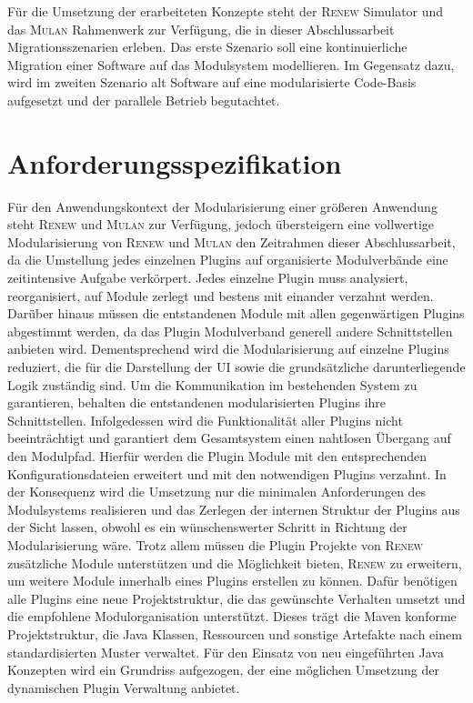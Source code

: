 	Für die Umsetzung der erarbeiteten Konzepte steht der \textsc{Renew} Simulator und das \textsc{Mulan} Rahmenwerk zur Verfügung, die in dieser Abschlussarbeit Migrationsszenarien erleben.\newline 
	Das erste Szenario soll eine kontinuierliche Migration einer Software auf das Modulsystem modellieren. Im Gegensatz dazu, wird im zweiten Szenario alt Software auf eine modularisierte Code-Basis aufgesetzt und der parallele Betrieb begutachtet. 

\section{Anforderungsspezifikation} 
	Für den Anwendungskontext der Modularisierung einer größeren Anwendung steht \textsc{Renew} und \textsc{Mulan} zur Verfügung, jedoch übersteigern eine vollwertige Modularisierung von \textsc{Renew} und \textsc{Mulan} den Zeitrahmen dieser Abschlussarbeit, da die Umstellung jedes einzelnen Plugins auf organisierte Modulverbände eine zeitintensive Aufgabe verkörpert. Jedes einzelne Plugin muss analysiert, reorganisiert, auf Module zerlegt und bestens mit einander verzahnt werden. Darüber hinaus müssen die entstandenen Module mit allen gegenwärtigen Plugins abgestimmt werden, da das Plugin Modulverband generell andere Schnittstellen anbieten wird. \bigbreak
	Dementsprechend wird die Modularisierung auf einzelne Plugins reduziert, die für die Darstellung der UI sowie die grundsätzliche darunterliegende Logik zuständig sind. Um die Kommunikation im bestehenden System zu garantieren, behalten die entstandenen modularisierten Plugins ihre Schnittstellen. Infolgedessen wird die Funktionalität aller Plugins nicht beeinträchtigt und garantiert dem Gesamtsystem einen nahtlosen Übergang auf den Modulpfad. Hierfür werden die Plugin Module mit den entsprechenden Konfigurationsdateien erweitert und mit den notwendigen Plugins verzahnt. In der Konsequenz wird die Umsetzung nur die minimalen Anforderungen des Modulsystems realisieren und das Zerlegen der internen Struktur der Plugins aus der Sicht lassen, obwohl es ein wünschenswerter Schritt in Richtung der Modularisierung wäre. \newline 
	Trotz allem müssen die Plugin Projekte von \textsc{Renew} zusätzliche Module unterstützen und die Möglichkeit bieten, \textsc{Renew} zu erweitern, um weitere Module innerhalb eines Plugins erstellen zu können. Dafür benötigen alle Plugins eine neue Projektstruktur, die das gewünschte Verhalten umsetzt und die empfohlene Modulorganisation unterstützt. Dieses trägt die Maven konforme Projektstruktur, die Java Klassen, Ressourcen und sonstige Artefakte nach einem standardisierten Muster verwaltet.\newline
	Für den Einsatz von neu eingeführten Java Konzepten wird ein Grundriss aufgezogen, der eine möglichen Umsetzung der dynamischen Plugin Verwaltung anbietet. \bigbreak

